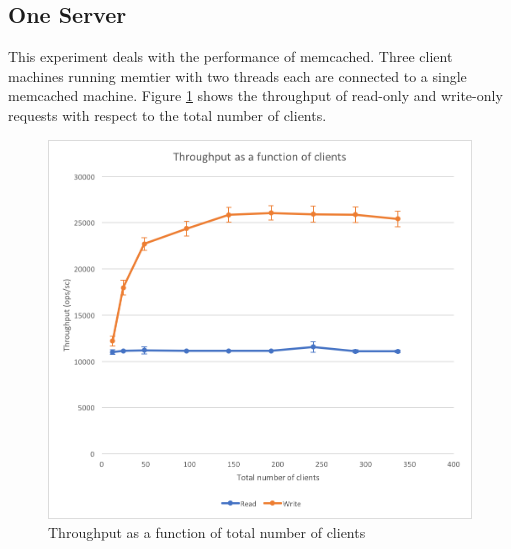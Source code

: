 \documentclass[11pt,a4paper]{article}
\begin{document}
\subsection{One Server}
This experiment deals with the performance of memcached. Three client machines running memtier with two threads each are connected to a single memcached machine. Figure \ref{png::bench_memcached_through-clients} shows the throughput of read-only and write-only requests with respect to the total number of clients.

\begin{figure}[!h]
    \centering
    \begin{minipage}[b]{.45\textwidth}
        \centering
        \includegraphics[width=\textwidth]{processing/graphics/bench_memcached_through-clients.png}
        \caption{Throughput as a function of total number of clients}
        \label{png::bench_memcached_through-clients}
    \end{minipage}
    \qquad
    \begin{minipage}[b]{.45\textwidth}
        \centering

\end{minipage}
\end{figure}
\end{document}
